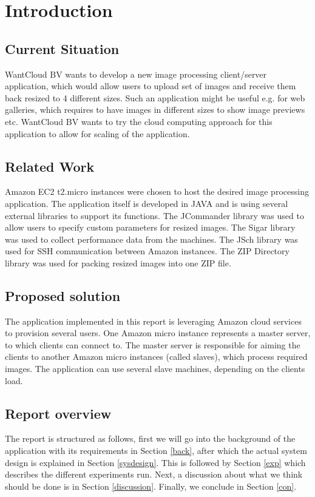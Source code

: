 \section{Introduction}
\subsection{Current Situation} 
WantCloud BV wants to develop a new image processing client/server application, which would allow users to upload set of images and receive them back resized to 4 different sizes. Such an application might be useful e.g. for web galleries, which requires to have images in different sizes to show image previews etc. WantCloud BV wants to try the cloud computing approach for this application to allow for scaling of the application.

\subsection{Related Work} 
Amazon EC2 t2.micro instances were chosen to host the desired image processing application. The application itself is developed in JAVA and is using several external libraries to support its functions. The JCommander library was used to allow users to specify custom parameters for resized images. The Sigar library was used to collect performance data from the machines. The JSch library was used for SSH communication between Amazon instances. The ZIP Directory library was used for packing resized images into one ZIP file.

\subsection{Proposed solution}
The application implemented in this report is leveraging Amazon cloud services to provision several users. One Amazon micro instance represents a master server, to which clients can connect to. The master server is responsible for aiming the clients to another Amazon micro instances (called slaves), which process required images. The application can use several slave machines, depending on the clients load.

\subsection{Report overview}
The report is structured as follows, first we will go into the background of the application with its requirements in Section \ref{back}, after which the actual system design is explained in Section \ref{sysdesign}. This is followed by Section \ref{exp} which describes the different experiments run. Next, a discussion about what we think should be done is in Section \ref{discussion}. Finally, we conclude in Section \ref{con}.